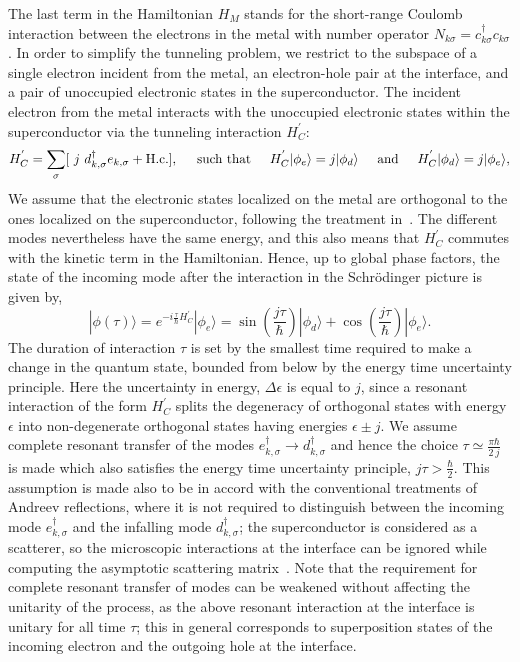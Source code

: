 \documentclass[10pt,letterpaper,aps,onecolumn,superscriptaddress,floatfix,notitlepage]{revtex4-1}
\begin{document}
	The last term in the Hamiltonian $H_{M}$ stands for the short-range Coulomb interaction between the electrons in the metal with number operator $N_{k\sigma}=c_{k\sigma}^{\dagger}c_{k\sigma}$. In order to simplify the tunneling problem, we restrict to the subspace of a single electron incident from the metal, an electron-hole pair at the interface, and a pair of unoccupied electronic states in the superconductor. The incident electron from the metal interacts with the unoccupied electronic states within the superconductor via the tunneling interaction $H^{'}_{C}$:
	\begin{equation}H^{'}_{C} = \sum\limits_{\sigma}[ ~j~d_{k,\sigma}^{\dagger}e_{k,\sigma}+\textrm{H.c.}],
	\hspace{0.5cm}\textrm{such that}\hspace{0.5cm} H^{'}_{C}|\phi_{e}\rangle = j|\phi_{d}\rangle\hspace{0.5cm}\textrm{and}\hspace{0.5cm}H^{'}_{C}|\phi_{d}\rangle = j|\phi_{e}\rangle,\end{equation}
	We assume  that the electronic states localized on the metal are orthogonal to the ones localized on the superconductor, following the treatment in~\cite{ARsecond}. The different modes nevertheless have the same energy, and this also means that $H^{'}_{C}$ commutes with the kinetic term in the Hamiltonian. Hence, up to global phase factors, the state of the incoming mode after the interaction in the Schr\"{o}dinger picture is given by,
	\begin{equation}\label{sincos}
	|\phi(\tau)\rangle=e^{-i\frac{\tau}{\hbar}H^{'}_{C}}|\phi_{e}\rangle = \sin(\frac{j\tau}{\hbar})|\phi_{d}\rangle+\cos(\frac{j\tau}{\hbar})|\phi_{e}\rangle.
	\end{equation}
	The duration of interaction $\tau$ is set by the smallest time required to make a change in the quantum state, bounded from below by the energy time uncertainty principle. Here the uncertainty in energy, $\Delta\epsilon$ is equal to $j$, since a resonant interaction of the form $H^{'}_{C}$ splits the degeneracy of orthogonal states with energy $\epsilon$ into non-degenerate orthogonal states having energies $\epsilon\pm j$. We assume complete resonant transfer of the modes $e^{\dagger}_{k,\sigma}\rightarrow d^{\dagger}_{k,\sigma}$ and hence the choice 
	$\tau \simeq \frac{\pi\hbar}{2~j}$
	is made which also satisfies the energy time uncertainty principle, $j\tau >\frac{\hbar}{2}$. This assumption is made also to be in accord with the conventional treatments of Andreev reflections, where it is not required to distinguish between the incoming mode $e^{\dagger}_{k,\sigma}$ and the infalling mode $d^{\dagger}_{k,\sigma}$; the superconductor is considered as a scatterer, so the microscopic interactions at the interface can be ignored while computing the asymptotic scattering matrix~\cite{andreev}. Note that the requirement for complete resonant transfer of modes can be weakened without affecting the unitarity of the process, as the above resonant interaction at the interface is unitary for all time $\tau$; this in general corresponds to superposition states of the incoming electron and the outgoing hole at the interface. 
	
\end{document}
